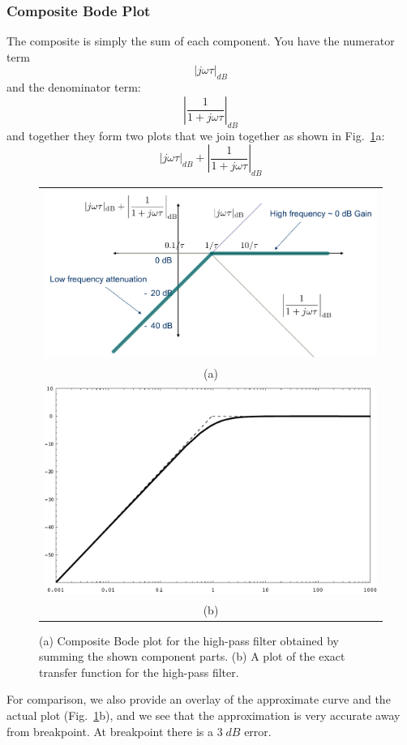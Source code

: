 \subsubsection{Composite Bode Plot}
The composite is simply the sum of each component.  You have the numerator term
    \begin{equation}
        {\left| {j\omega \tau } \right|_{dB}}
    \end{equation}
and the denominator term:
    \begin{equation}
        {\left| {\frac{1}{{1 + j\omega \tau }}} \right|_{dB}}
    \end{equation}
and together they form two plots that we join together as shown in Fig.~\ref{fig:bode}a:
    \begin{equation}
        {\left| {j\omega \tau } \right|_{dB}} + {\left| {\frac{1}{{1 + j\omega \tau }}} \right|_{dB}}
    \end{equation}
\begin{figure}[tb]
\centering
\begin{tabular}{c}
\includegraphics[width=.75\columnwidth]{mod1_3_11_bode3}\\
(a)\\
\includegraphics[angle=-0.0,width=.75\columnwidth]{mag_hpf}\\
(b)\\
\end{tabular}
\caption{(a) Composite Bode plot for the high-pass filter obtained by summing the shown component parts.  (b) A plot of the exact transfer function for the high-pass filter.}
\label{fig:bode}
\end{figure}
For comparison, we also provide an overlay of the approximate curve and the actual plot (Fig.~\ref{fig:bode}b), and we see that the approximation is very accurate away from breakpoint.   At breakpoint there is a $3\;dB$ error.
